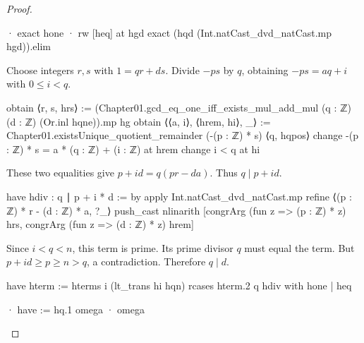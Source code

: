 \begin{proof}
\begin{lean}
      · exact hone
      · rw [heq] at hgd
        exact (hqd (Int.natCast_dvd_natCast.mp hgd)).elim
  \end{lean}

  Choose integers $r,s$ with $1=qr+ds$.
  Divide $-ps$ by $q$, obtaining $-ps=aq+i$ with $0\le i<q$.

  \begin{lean}
    obtain ⟨r, s, hrs⟩ :=
      (Chapter01.gcd_eq_one_iff_exists_mul_add_mul (q : ℤ) (d : ℤ) (Or.inl hqne)).mp hg
    obtain ⟨⟨a, i⟩, ⟨hrem, hi⟩, _⟩ :=
      Chapter01.existsUnique_quotient_remainder (-(p : ℤ) * s) ⟨q, hqpos⟩
    change -(p : ℤ) * s = a * (q : ℤ) + (i : ℤ) at hrem
    change i < q at hi
  \end{lean}

  These two equalities give $p+id=q(pr-da)$.
  Thus $q\mid p+id$.

  \begin{lean}
    have hdiv : q ∣ p + i * d := by
      apply Int.natCast_dvd_natCast.mp
      refine ⟨(p : ℤ) * r - (d : ℤ) * a, ?_⟩
      push_cast
      nlinarith [congrArg (fun z => (p : ℤ) * z) hrs,
        congrArg (fun z => (d : ℤ) * z) hrem]
  \end{lean}

  Since $i<q<n$, this term is prime.
  Its prime divisor $q$ must equal the term.
  But $p+id\ge p\ge n>q$, a contradiction.
  Therefore $q\mid d$.

  \begin{lean}
    have hterm := hterms i (lt_trans hi hqn)
    rcases hterm.2 q hdiv with hone | heq

    · have := hq.1
      omega
    · omega
  \end{lean}

\end{proof}
